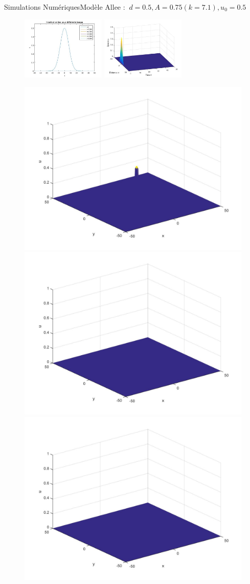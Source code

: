 \documentclass[10pt]{beamer}
\begin{document}
\begin{frame}{Simulations Numériques}{Modèle Allee : $\ d=0.5, A=0.75 (k=7.1), u_0=0.5$}
\begin{figure}[H]
	\centering
	\includegraphics[width=0.40\linewidth, height=3cm]{Allee/F2322}\hfill
	\includegraphics[width=0.55\linewidth, height=3cm]{Allee/F4322}
\end{figure}
\begin{figure}[H]
	\centering
	\includegraphics[width=0.3\linewidth]{Allee/322__1_}\hfill
    \includegraphics[width=0.3\linewidth]{Allee/322__2_}\hfill
	\includegraphics[width=0.3\linewidth]{Allee/322__3_}
\end{figure}
\end{frame}
\end{document}

